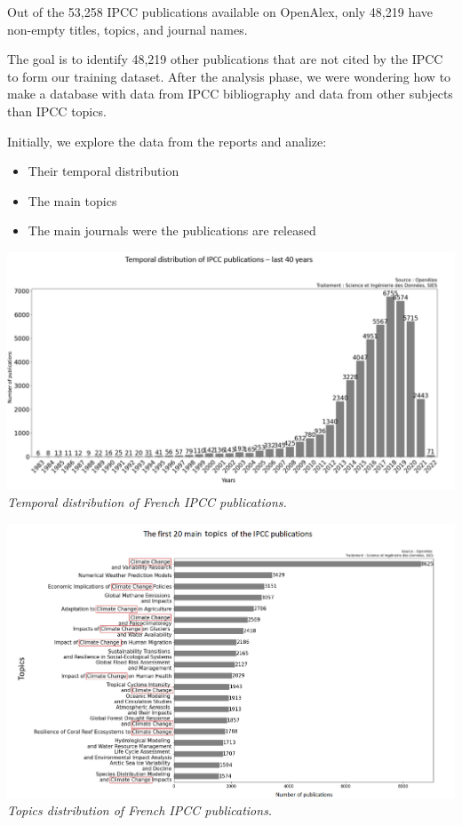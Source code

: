 \documentclass[
]{article}
\providecommand{\tightlist}{%
  \setlength{\itemsep}{0pt}\setlength{\parskip}{0pt}}
\begin{document}
Out of the 53,258 IPCC publications available on OpenAlex, only 48,219
have non-empty titles, topics, and journal names.

The goal is to identify 48,219 other publications that are not cited by
the IPCC to form our training dataset. After the analysis phase, we were
wondering how to make a database with data from IPCC bibliography and
data from other subjects than IPCC topics.

Initially, we explore the data from the reports and analize:

\begin{itemize}
\tightlist
\item
  Their temporal distribution
\item
  The main topics
\item
  The main journals were the publications are released
\end{itemize}

\includegraphics{./images/time_distribution_IPCC_model.png}
\emph{Temporal distribution of French IPCC publications.}

\includegraphics{./images/topics_distribution_IPCC_model.png}
\emph{Topics distribution of French IPCC publications.}
\end{document}
